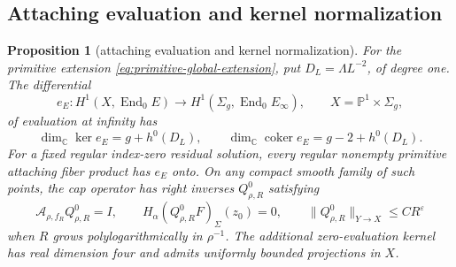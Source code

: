 \documentclass[11pt]{amsart}
\newtheorem{proposition}[theorem]{Proposition}
\theoremstyle{definition}
\theoremstyle{remark}
\theoremstyle{plain}
\newcommand{\CC}{\mathbb{C}}
\newcommand{\PP}{\mathbb{P}}
\newcommand{\End}{\operatorname{End}}
\begin{document}
\subsection{Attaching evaluation and kernel normalization}
\begin{proposition}[attaching evaluation and kernel normalization]
\label{prop:attaching-kernel-normalization}
For the primitive extension \eqref{eq:primitive-global-extension},
put $D_L=\Lambda L^{-2}$, of degree one. The differential
\[
 e_E:H^1(X,\End_0E)\longrightarrow H^1(\Sigma_g,\End_0E_\infty),
 \qquad X=\PP^1\times\Sigma_g,
\]
of evaluation at infinity has
\begin{equation}\label{eq:attaching-evaluation-dimensions}
 \dim_\CC\ker e_E=g+h^0(D_L),\qquad
 \dim_\CC\operatorname{coker}e_E=g-2+h^0(D_L).
\end{equation}
For a fixed regular index-zero residual solution, every regular
nonempty primitive attaching fiber product has $e_E$ onto.
On any compact smooth family of such points, the cap operator
has right inverses $Q^0_{\rho,R}$ satisfying
\begin{equation}\label{eq:normalized-attaching-cap-inverse}
 \mathcal A_{\rho,f_R}Q^0_{\rho,R}=I,\qquad
 H_\alpha(Q^0_{\rho,R}F)_\Sigma(z_0)=0,\qquad
 \|Q^0_{\rho,R}\|_{Y\to X}\leq CR^\varepsilon
\end{equation}
when $R$ grows polylogarithmically in $\rho^{-1}$.
The additional zero-evaluation kernel has real dimension four
and admits uniformly bounded projections in $X$.
\end{proposition}
\end{document}

